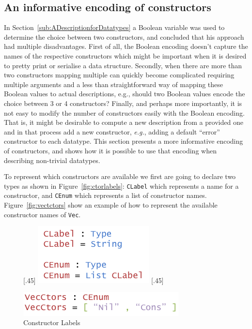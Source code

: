 \documentclass{ituthesis}
\newcommand{\tttype}[1]{\textcolor{type-color}{\texttt{#1}}}
\newcommand{\ttdec}[1]{\textcolor{declared-var-color}{\texttt{#1}}}
\begin{document}
\subsection{An informative encoding of constructors}
\label{sub:AnInformativeEncodingofConstructors}
In Section~\ref{sub:ADescriptionforDatatypes} a Boolean variable was used to determine the choice between two constructors, and concluded that his approach had multiple disadvantages.
First of all, the Boolean encoding doesn't capture the names of the respective constructors which might be important when it is desired to pretty print or serialise a data structure.
Secondly, when there are more than two constructors mapping multiple can quickly become complicated requiring multiple arguments and a less than straightforward way of mapping these Boolean values to actual descriptions, e.g.,
should two Boolean values encode the choice between 3 or 4 constructors?
Finally, and perhaps more importantly, it is not easy to modify the number of constructors easily with the Boolean encoding. That is, it might be desirable to compute a new description from a provided one and in that process add a new constructor,
\textit{e.g.}, adding a default ``error'' constructor to each datatype.
This section presents a more informative encoding of constructors, and shows how it is possible to use that encoding when describing non-trivial datatypes.

To represent which constructors are available we first are going to declare two types as shown in Figure~\ref{fig:ctorlabels}: \ttdec{CLabel} which represents a name for a constructor, and \ttdec{CEnum} which
represents a list of constructor names. Figure~\ref{fig:vectctors} show an example of how to represent the available constructor names of \tttype{Vec}.


\begin{figure}[ht]
\begin{center}
  [.45\textwidth]{
    \includegraphics[scale=0.5]{Figures/AnInformativeEncodingofConstructorsLabels.png}
}
[.45\textwidth]{
    \includegraphics[scale=0.5]{Figures/VectorConstructors.png}

}
\caption{Constructor Labels}
\end{center}
\end{figure}
\end{document}
